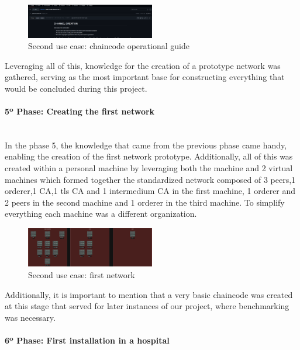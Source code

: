 \begin{figure}[H]
    \centering
    \includegraphics[width=0.5\textwidth]{assets/use-case-2/notes-channel-and-chaincode.png} %
    \caption{Second use case: chaincode operational guide}
    \label{fig:sample-image} 
\end{figure}

Leveraging all of this, knowledge for the creation of a prototype network was gathered, serving as the most important base for 
constructing everything that would be concluded during this project.

\paragraph{5º Phase: Creating the first network}\mbox{}\\

In the phase 5, the knowledge that came from the previous phase came handy, enabling the creation of the first network prototype. Additionally,
all of this was created within a personal machine by leveraging both the machine and 2 virtual machines which formed together 
the standardized network composed of 3 peers,1 orderer,1 CA,1 tls CA and 1 intermedium CA in the first machine, 1 orderer and 2 peers 
in the second machine and 1 orderer in the third machine. To simplify everything each machine was a different organization.

\begin{figure}[H]
    \centering
    \includegraphics[width=0.5\textwidth]{assets/use-case-2/default-first-netwrk.drawio.png} %
    \caption{Second use case: first network}
    \label{fig:sample-image} 
\end{figure}

Additionally, it is important to mention that a very basic chaincode was created at this stage that served for later instances of our 
project, where benchmarking was necessary.

\paragraph{6º Phase: First installation in a hospital}\mbox{}\\

